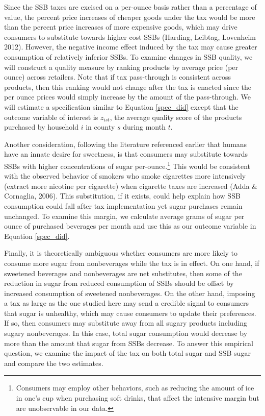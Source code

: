 \documentclass[12pt]{article}
\begin{document}
Since the SSB taxes are excised on a per-ounce basis rather than a percentage of value, the percent price increases of cheaper goods under the tax would be more than the percent price increases of more expensive goods, which may drive consumers to substitute towards higher cost SSBs (Harding, Leibtag, Lovenheim 2012). However, the negative income effect induced by the tax may cause greater consumption of relatively inferior SSBs. To examine changes in SSB quality, we will construct a quality measure by ranking products by average price (per ounce) across retailers. Note that if tax pass-through is consistent across products, then this ranking would not change after the tax is enacted since the per ounce prices would simply increase by the amount of the pass-through. We will estimate a specification similar to Equation \ref{spec_did} except that the outcome variable of interest is $z_{ist}$, the average quality score of the products purchased by household $i$ in county $s$ during month $t$.

Another consideration, following the literature referenced earlier that humans have an innate desire for sweetness, is that consumers may substitute towards SSBs with higher concentrations of sugar per-ounce.\footnote{Consumers may employ other behaviors, such as reducing the amount of ice in one's cup when purchasing soft drinks, that affect the intensive margin but are unobservable in our data.} This would be consistent with the observed behavior of smokers who smoke cigarettes more intensively (extract more nicotine per cigarette) when cigarette taxes are increased (Adda \& Cornaglia, 2006). This substitution, if it exists, could help explain how SSB consumption could fall after tax implementation yet sugar purchases remain unchanged. To examine this margin, we calculate average grams of sugar per ounce of purchased beverages per month and use this as our outcome variable in Equation \ref{spec_did}.

Finally, it is theoretically ambiguous whether consumers are more likely to consume more sugar from nonbeverages while the tax is in effect. On one hand, if sweetened beverages and nonbeverages are net substitutes, then some of the reduction in sugar from reduced consumption of SSBs should be offset by increased consumption of sweetened nonbeverages. On the other hand, imposing a tax as large as the one studied here may send a credible signal to consumers that sugar is unhealthy, which may cause consumers to update their preferences. If so, then consumers may substitute away from all sugary products including sugary nonbeverages. In this case, total sugar consumption would decrease by more than the amount that sugar from SSBs decrease. To answer this empirical question, we examine the impact of the tax on both total sugar and SSB sugar and compare the two estimates.
\end{document}

